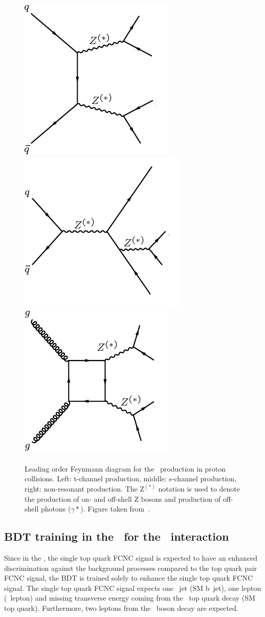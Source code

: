 \begin{figure}[htbp]
	\centering
	\includegraphics[width=0.3\linewidth]{6_Search/Figures/Feynman/ZZ}
	\includegraphics[width=0.3\linewidth]{6_Search/Figures/Feynman/ZZ2}
		\includegraphics[width=0.3\linewidth]{6_Search/Figures/Feynman/ZZ3}
	\caption{Leading order Feynmann diagram for the \ZZ\ production in proton collisions. Left: t-channel production, middle: s-channel production, right: non-resonant production. The Z$^{(*)}$ notation is used to denote the production of on- and off-shell Z bosons and production of off-shell photons ($\gamma*$). Figure taken from~\cite{Khachatryan:1712680}.}
	\label{fig:ZZ}
\end{figure}
\newpage
\subsection{BDT training in the \STSR\ for the \Zut\ interaction}
\label{sec:BDTSTSRZUT}
Since in the \STSR, the single top quark FCNC signal is expected to have an enhanced discrimination against the background processes compared to the top quark pair FCNC signal,  the BDT is trained solely to enhance the single top quark FCNC signal. The single top quark FCNC signal expects one \Pbottom\ jet (SM b~jet), one lepton (\PW\ lepton) and missing transverse energy coming from the \SM\ top quark decay (SM top quark). Furthermore, two leptons from the \PZ\ boson decay are expected. 

